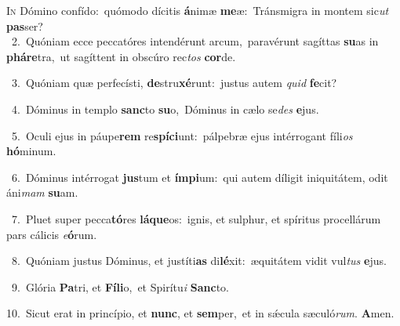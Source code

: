 \lettrine{\initial\textcolor{\initialcolor}{I}}{n} Dómino confído:~\dagger quómodo dícitis \textbf{á}\-nimæ \textbf{me}\-æ:~\star Tránsmigra in montem sic\textit{ut} \textbf{pas}\-ser?\\
{\numbfont\textcolor{\numbcolor}{~2.}}~Quóniam ecce peccatóres intendérunt arcum,~\dagger paravérunt sagíttas \textbf{su}\-as in \textbf{phá}\-\textbf{re}tra,~\star ut sagíttent in obscúro rec\textit{tos} \textbf{cor}\-de.\par
{\numbfont\textcolor{\numbcolor}{~3.}}~Quóniam quæ perfecísti, \textbf{de}\-stru\-\textbf{xé}\-runt:~\star justus autem \textit{quid} \textbf{fe}\-cit?\par
{\numbfont\textcolor{\numbcolor}{~4.}}~Dóminus in templo \textbf{sanc}\-to \textbf{su}\-o,~\star Dóminus in cælo se\textit{des} \textbf{e}\-jus.\par
{\numbfont\textcolor{\numbcolor}{~5.}}~Oculi ejus in páupe\textbf{rem} re\-\textbf{spí}\-\textbf{ci}unt:~\star pálpebræ ejus intérrogant fíli\textit{os} \textbf{hó}\-minum.\par
{\numbfont\textcolor{\numbcolor}{~6.}}~Dóminus intérrogat \textbf{jus}\-tum et \textbf{ím}\-\textbf{pi}um:~\star qui autem díligit iniquitátem, odit áni\textit{mam} \textbf{su}\-am.\par
{\numbfont\textcolor{\numbcolor}{~7.}}~Pluet super pecca\-\textbf{tó}\-res \textbf{lá}\-\textbf{que}os:~\star ignis, et sulphur, et spíritus procellárum pars cálicis \textit{e}\-\textbf{ó}rum.\par
{\numbfont\textcolor{\numbcolor}{~8.}}~Quóniam justus Dóminus, et justíti\textbf{as} di\-\textbf{lé}\-xit:~\star æquitátem vidit vul\textit{tus} \textbf{e}\-jus.\par
{\numbfont\textcolor{\numbcolor}{~9.}}~Glória \textbf{Pa}\-tri, et \textbf{Fí}\-\textbf{li}o,~\star et Spirítu\textit{i} \textbf{Sanc}\-to.\par
{\numbfont\textcolor{\numbcolor}{10.}}~Sicut erat in princípio, et \textbf{nunc}\-, et \textbf{sem}\-per,~\star et in sǽcula sæculó\-\textit{rum}\-. \textbf{A}\-men.\par
